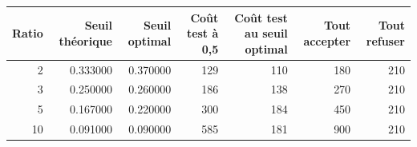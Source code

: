 \begin{tabular}{rrrrrrr}
\toprule
Ratio & Seuil théorique & Seuil optimal & Coût test à 0,5 & Coût test au seuil optimal & Tout accepter & Tout refuser \\
\midrule
2 & 0.333000 & 0.370000 & 129 & 110 & 180 & 210 \\
3 & 0.250000 & 0.260000 & 186 & 138 & 270 & 210 \\
5 & 0.167000 & 0.220000 & 300 & 184 & 450 & 210 \\
10 & 0.091000 & 0.090000 & 585 & 181 & 900 & 210 \\
\bottomrule
\end{tabular}

